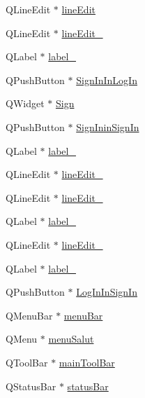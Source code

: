 \begin{DoxyCompactItemize}
Q\+Line\+Edit $\ast$ \mbox{\hyperlink{classUi__MainWindow_a7a5b9a4633d64f502ce81da3202d828c}{line\+Edit}}
\item 
Q\+Line\+Edit $\ast$ \mbox{\hyperlink{classUi__MainWindow_a21de642ed1cae607a93ed897a08bfe09}{line\+Edit\+\_}}
\item 
Q\+Label $\ast$ \mbox{\hyperlink{classUi__MainWindow_a2e2516d755e4dd53fc905dabddf2738a}{label\+\_}}
\item 
Q\+Push\+Button $\ast$ \mbox{\hyperlink{classUi__MainWindow_a1eac8ce0cd6eb51e5722986574bedc40}{Sign\+In\+In\+Log\+In}}
\item 
Q\+Widget $\ast$ \mbox{\hyperlink{classUi__MainWindow_aeda870860187f29a6ec7dc2604b2bb39}{Sign}}
\item 
Q\+Push\+Button $\ast$ \mbox{\hyperlink{classUi__MainWindow_a32d604972ebe95bb691b1ba587d57cc1}{Sign\+Inin\+Sign\+In}}
\item 
Q\+Label $\ast$ \mbox{\hyperlink{classUi__MainWindow_a0376fd90247280e7c7957cc70628708c}{label\+\_}}
\item 
Q\+Line\+Edit $\ast$ \mbox{\hyperlink{classUi__MainWindow_a3fbb7e1a35cf9326852c9441df2401a4}{line\+Edit\+\_}}
\item 
Q\+Line\+Edit $\ast$ \mbox{\hyperlink{classUi__MainWindow_a408dc528bc4bdd94281470ef1ecd3fef}{line\+Edit\+\_}}
\item 
Q\+Label $\ast$ \mbox{\hyperlink{classUi__MainWindow_a78c7e10730b43c6700cd7216911ed76a}{label\+\_}}
\item 
Q\+Line\+Edit $\ast$ \mbox{\hyperlink{classUi__MainWindow_a71622c09adbb203445b6bdadb659cc74}{line\+Edit\+\_}}
\item 
Q\+Label $\ast$ \mbox{\hyperlink{classUi__MainWindow_ad6bab8fb8903b8f41afea1218ee52695}{label\+\_}}
\item 
Q\+Push\+Button $\ast$ \mbox{\hyperlink{classUi__MainWindow_a0b2e74594be9b12bfa1b759694cc921f}{Log\+In\+In\+Sign\+In}}
\item 
Q\+Menu\+Bar $\ast$ \mbox{\hyperlink{classUi__MainWindow_a2be1c24ec9adfca18e1dcc951931457f}{menu\+Bar}}
\item 
Q\+Menu $\ast$ \mbox{\hyperlink{classUi__MainWindow_a5a51946ba5f3e6375d48f61ac61883be}{menu\+Salut}}
\item 
Q\+Tool\+Bar $\ast$ \mbox{\hyperlink{classUi__MainWindow_a5172877001c8c7b4e0f6de50421867d1}{main\+Tool\+Bar}}
\item 
Q\+Status\+Bar $\ast$ \mbox{\hyperlink{classUi__MainWindow_a50fa481337604bcc8bf68de18ab16ecd}{status\+Bar}}
\end{DoxyCompactItemize}


